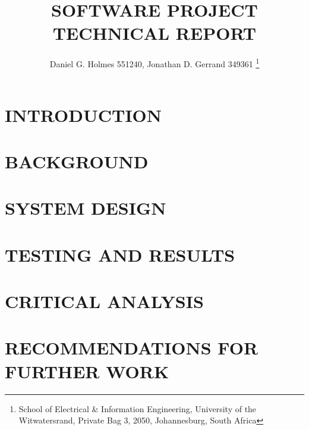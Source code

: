 \documentclass[10pt,twocolumn]{witseiepaper}
\begin{document}
\title{SOFTWARE PROJECT TECHNICAL REPORT}

\author{Daniel G. Holmes 551240, Jonathan D. Gerrand 349361
\thanks{School of Electrical \& Information Engineering, University of the
Witwatersrand, Private Bag 3, 2050, Johannesburg, South Africa}
}

%



\maketitle
\thispagestyle{empty}\pagestyle{empty}


%
\section{INTRODUCTION}



%
\section{BACKGROUND}


%
\section{SYSTEM DESIGN}



%
\section{TESTING AND RESULTS}



%
\section{CRITICAL ANALYSIS}



%
\section{RECOMMENDATIONS FOR FURTHER WORK}
\end{document}
